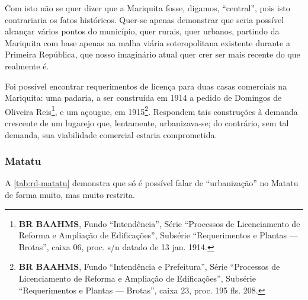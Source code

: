 Com isto não se quer dizer que a Mariquita fosse, digamos, ``central'', pois isto contrariaria os fatos históricos. Quer-se apenas demonstrar que seria possível alcançar vários pontos do município, quer rurais, quer urbanos, partindo da Mariquita com base apenas na malha viária soteropolitana existente durante a Primeira República, que nosso imaginário atual quer crer ser mais recente do que realmente é.


Foi possível encontrar requerimentos de licença para duas casas comerciais na Mariquita: uma padaria, a ser construída em 1914 a pedido de Domingos de Oliveira Reis\footnote{\textbf{BR BAAHMS}, Fundo ``Intendência'', Série ``Processos de Licenciamento de Reforma e Ampliação de Edificações'', Subsérie ``Requerimentos e Plantas --- Brotas'', caixa 06, proc. s/n datado de 13 jan. 1914.}, e um açougue, em 1915\footnote{\textbf{BR BAAHMS}, Fundo ``Intendência e Prefeitura'', Série ``Processos de Licenciamento de Reforma e Ampliação de Edificações'', Subsérie ``Requerimentos e Plantas --- Brotas'', caixa 23, proc. 195 fls. 208.}. Respondem tais construções à demanda crescente de um lugarejo que, lentamente, urbanizava-se; do contrário, sem tal demanda, sua viabilidade comercial estaria comprometida.












\subsubsection{Matatu}\label{subsubsec:matatu}


A \autoref{tab:rd-matatu} demonstra que só é possível falar de ``urbanização'' no Matatu de forma muito, mas muito restrita.







